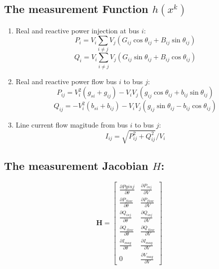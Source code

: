 \documentclass[12pt]{article}
\begin{document}
\subsection*{The measurement Function $h(x^k)$}

\begin{enumerate}
\item Real and reactive power injection at bus $i$:
\begin{equation}\label{eq:Pi}
P_i = V_i \sum_{i\ne j}V_j(G_{ij}\cos \theta _{ij}+B_{ij}\sin \theta _{ij})
\end{equation} 
\begin{equation}\label{eq:Qi}
Q_i = V_i \sum_{i\ne j}V_j(G_{ij}\sin \theta _{ij}+B_{ij}\cos \theta _{ij})
\end{equation} 
\item Real and reactive power flow bus $i$ to bus $j$:
\begin{equation}\label{eq:Pij}
P_{ij} = V_i^2(g_{si}+g_{ij}) -V_iV_j(g_{ij}\cos \theta _{ij}+b_{ij}\sin \theta _{ij})
\end{equation}
\begin{equation}\label{eq:Qij}
Q_{ij} = -V_i^2(b_{si}+b_{ij}) -V_iV_j(g_{ij}\sin \theta _{ij}-b_{ij}\cos \theta _{ij})
\end{equation}
\item Line current flow magitude from bus $i$ to bus $j$:
\begin{equation}\label{eq:Iij}
I_{ij} = \sqrt {P_{ij}^2+Q_{ij}^2}/V_i
\end{equation}
\end{enumerate}




\subsection*{The measurement Jacobian $H$:}

\begin{equation}
\mathbf{H}  =\begin{bmatrix}
\frac{\partial Pg{inj}}{\partial \theta} & \frac{\partial P_{inj}}{\partial V}\\ 
\frac{\partial P_{flow}}{\partial \theta} & \frac{\partial P_{flow}}{\partial V}\\ 
\frac{\partial Q_{inj}}{\partial \theta} & \frac{\partial Q_{inj}}{\partial V}\\ 
\frac{\partial Q_{flow}}{\partial \theta} & \frac{\partial Q_{flow}}{\partial V}\\ 
\frac{\partial I_{mag}}{\partial \theta} & \frac{\partial I_{mag}}{\partial V}\\ 
0 & \frac{\partial V_{mag}}{\partial V}
\end{bmatrix}
\end{equation}
\end{document}
